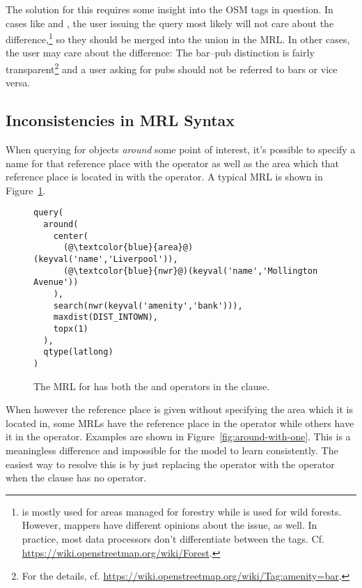 The solution for this requires some insight into the OSM tags in question. In
cases like  and , the user issuing
the query most likely will not care about the
difference,\footnote{ is mostly used for areas managed
  for forestry while  is used for wild forests. However,
  mappers have different opinions about the issue, as well. In practice, most
  data processors don’t differentiate between the tags. Cf.
  \url{https://wiki.openstreetmap.org/wiki/Forest}.} so they should be merged
into the union  in the MRL. In other
cases, the user may care about the difference: The bar--pub distinction is fairly
transparent\footnote{For the details, cf.
  \url{https://wiki.openstreetmap.org/wiki/Tag:amenity=bar}.} and a user asking
for pubs should not be referred to bars or vice versa.

\subsection{Inconsistencies in MRL Syntax}
\label{sec:mrl-inconsistencies}

When querying for objects \emph{around} some point of interest, it’s possible to
specify a name for that reference place with the  operator as well as
the area which that reference place is located in with the  operator.
A typical MRL is shown in Figure~\ref{fig:around-with-both}.

\begin{figure}[h]
  \centering
  \begin{lstlisting}[style=MyMRL]
query(
  around(
    center(
      (@\textcolor{blue}{area}@)(keyval('name','Liverpool')),
      (@\textcolor{blue}{nwr}@)(keyval('name','Mollington Avenue'))
    ),
    search(nwr(keyval('amenity','bank'))),
    maxdist(DIST_INTOWN),
    topx(1)
  ),
  qtype(latlong)
)
  \end{lstlisting}
  \caption[Typical \emph{around}-query]{The MRL for  has both the  and 
    operators in the  clause.}
  \label{fig:around-with-both}
\end{figure}

When however the reference place is given without specifying the area which it
is located in, some MRLs have the reference place in the  operator
while others have it in the  operator. Examples are shown in
Figure~\ref{fig:around-with-one}. This is a meaningless difference and
impossible for the model to learn consistently. The easiest way to resolve this
is by just replacing the  operator with the  operator when
the  clause has no  operator.

